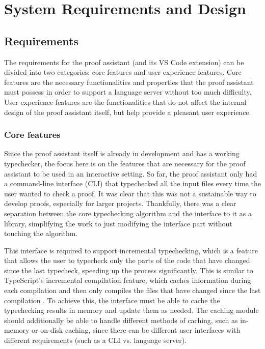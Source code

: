 \chapter{System Requirements and Design}
\label{chap:req}

\section{Requirements}

The requirements for the proof assistant (and its VS Code extension) can be divided into two categories:
core features and user experience features.
Core features are the necessary functionalities and properties that the proof assistant must possess in order to support
a language server without too much difficulty.
User experience features are the functionalities that do not affect the internal design of the proof assistant itself,
but help provide a pleasant user experience.

\subsection{Core features}

Since the \Rzk{} proof assistant itself is already in development and has a working typechecker,
the focus here is on the features that are necessary for the proof assistant to be used in an interactive setting.
So far, the proof assistant only had a command-line interface (CLI) that typechecked all the input files
every time the user wanted to check a proof.
It was clear that this was not a sustainable way to develop proofs, especially for larger projects.
Thankfully, there was a clear separation between the core typechecking algorithm and the interface to it as a library,
simplifying the work to just modifying the interface part without touching the algorithm.

This interface is required to support incremental typechecking, which is a feature that allows the user to typecheck
only the parts of the code that have changed since the last typecheck, speeding up the process significantly.
This is similar to TypeScript's incremental compilation feature, which caches information during each compilation
and then only compiles the files that have changed since the last compilation \cite{Vanderkam2024}.
To achieve this, the interface must be able to cache the typechecking results in memory and update them as needed.
The caching module should additionally be able to handle different methods of caching, such as in-memory or on-disk caching,
since there can be different user interfaces with different requirements (such as a CLI vs. language server).

